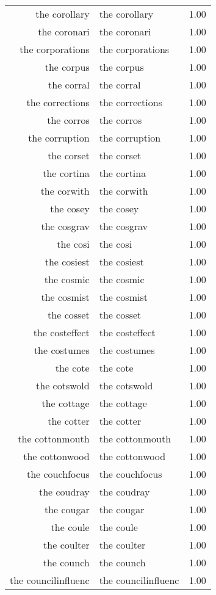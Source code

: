 \begin{table}[ht]
\begin{tabular}{rlr}
  the corollary & the corollary & 1.00 \\ 
  the coronari & the coronari & 1.00 \\ 
  the corporations & the corporations & 1.00 \\ 
  the corpus & the corpus & 1.00 \\ 
  the corral & the corral & 1.00 \\ 
  the corrections & the corrections & 1.00 \\ 
  the corros & the corros & 1.00 \\ 
  the corruption & the corruption & 1.00 \\ 
  the corset & the corset & 1.00 \\ 
  the cortina & the cortina & 1.00 \\ 
  the corwith & the corwith & 1.00 \\ 
  the cosey & the cosey & 1.00 \\ 
  the cosgrav & the cosgrav & 1.00 \\ 
  the cosi & the cosi & 1.00 \\ 
  the cosiest & the cosiest & 1.00 \\ 
  the cosmic & the cosmic & 1.00 \\ 
  the cosmist & the cosmist & 1.00 \\ 
  the cosset & the cosset & 1.00 \\ 
  the costeffect & the costeffect & 1.00 \\ 
  the costumes & the costumes & 1.00 \\ 
  the cote & the cote & 1.00 \\ 
  the cotswold & the cotswold & 1.00 \\ 
  the cottage & the cottage & 1.00 \\ 
  the cotter & the cotter & 1.00 \\ 
  the cottonmouth & the cottonmouth & 1.00 \\ 
  the cottonwood & the cottonwood & 1.00 \\ 
  the couchfocus & the couchfocus & 1.00 \\ 
  the coudray & the coudray & 1.00 \\ 
  the cougar & the cougar & 1.00 \\ 
  the coule & the coule & 1.00 \\ 
  the coulter & the coulter & 1.00 \\ 
  the counch & the counch & 1.00 \\ 
  the councilinfluenc & the councilinfluenc & 1.00 \\ 

\end{tabular}
\end{table}
